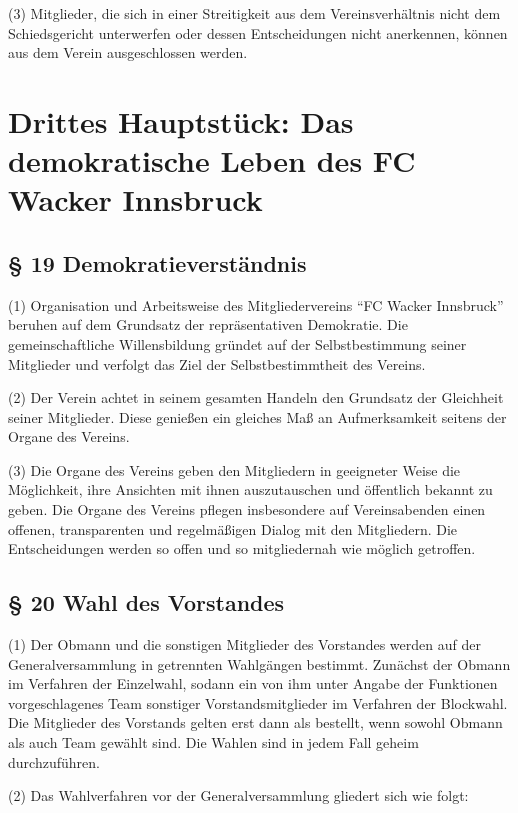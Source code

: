 \documentclass[10pt,a4paper]{article}
\begin{document}
(3)
Mitglieder, die sich in einer Streitigkeit aus dem Vereinsverhältnis nicht dem Schiedsgericht unterwerfen oder dessen Entscheidungen nicht anerkennen, können aus dem Verein ausgeschlossen werden.

\clearpage

\section{Drittes Hauptstück: Das demokratische Leben des FC Wacker Innsbruck}

\subsection{§ 19
Demokratieverständnis}

(1)
Organisation und Arbeitsweise des Mitgliedervereins "`FC Wacker Innsbruck"' beruhen auf dem Grundsatz der repräsentativen Demokratie.
Die gemeinschaftliche Willensbildung gründet auf der Selbstbestimmung seiner Mitglieder und verfolgt das Ziel der Selbstbestimmtheit des Vereins.

(2)
Der Verein achtet in seinem gesamten Handeln den Grundsatz der Gleichheit seiner Mitglieder.
Diese genießen ein gleiches Maß an Aufmerksamkeit seitens der Organe des Vereins.

(3)
Die Organe des Vereins geben den Mitgliedern in geeigneter Weise die Möglichkeit, ihre Ansichten mit ihnen auszutauschen und öffentlich bekannt zu geben.
Die Organe des Vereins pflegen insbesondere auf Vereinsabenden einen offenen, transparenten und regelmäßigen Dialog mit den Mitgliedern.
Die Entscheidungen werden so offen und so mitgliedernah wie möglich getroffen.

\subsection{§ 20
Wahl des Vorstandes}

(1)
Der Obmann und die sonstigen Mitglieder des Vorstandes werden auf der Generalversammlung in getrennten Wahlgängen bestimmt.
Zunächst der Obmann im Verfahren der Einzelwahl, sodann ein von ihm unter Angabe der Funktionen vorgeschlagenes Team sonstiger Vorstandsmitglieder im Verfahren der Blockwahl.
Die Mitglieder des Vorstands gelten erst dann als bestellt, wenn sowohl Obmann als auch Team gewählt sind.
Die Wahlen sind in jedem Fall geheim durchzuführen.

(2)
Das Wahlverfahren vor der Generalversammlung gliedert sich wie folgt:
\end{document}
